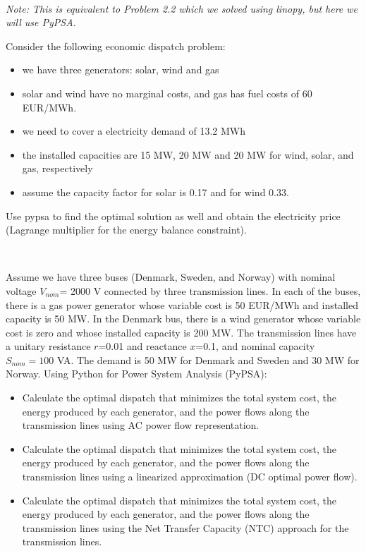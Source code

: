 \documentclass[10pt]{article}
\newenvironment{problem}[2][Problem]{\begin{trivlist}
\item[\hskip \labelsep {\bfseries #1}\hskip \labelsep {\bfseries #2.}]}{\end{trivlist}}
\begin{document}
\

\begin{problem}{5.3}

\textit{Note: This is equivalent to Problem 2.2 which we solved using linopy, but here we will use PyPSA.}

Consider the following economic dispatch problem:

\begin{itemize}
\item[-] we have three generators: solar, wind and gas

\item[-] solar and wind have no marginal costs, and gas has fuel costs of 60 EUR/MWh.

\item[-] we need to cover a electricity demand of 13.2 MWh

\item[-] the installed capacities are 15 MW, 20 MW and 20 MW for wind, solar, and gas, respectively

\item[-] assume the capacity factor for solar is 0.17 and for wind 0.33.
\end{itemize}

Use pypsa to find the optimal solution as well and obtain the electricity price (Lagrange multiplier for the energy balance constraint).
\end{problem}

\

\begin{problem}{5.4}
Assume we have three buses (Denmark, Sweden, and Norway) with nominal voltage $V_{nom}$= 2000 V connected by three transmission lines. In each of the buses, there is a gas power generator whose variable cost is 50 EUR/MWh and installed capacity is 50 MW. In the Denmark bus, there is a wind generator whose variable cost is zero and whose installed capacity is 200 MW. The transmission lines have a unitary resistance $r$=0.01 and reactance $x$=0.1, and nominal capacity $S_{nom}=100$ VA. The demand is 50 MW for Denmark and Sweden and 30 MW for Norway. Using Python for Power System Analysis (PyPSA):

\begin{itemize}
\item[a)] Calculate the optimal dispatch that minimizes the total system cost, the energy produced by each generator, and the power flows along the transmission lines using AC power flow representation.

\item[b)] Calculate the optimal dispatch that minimizes the total system cost,  the energy produced by each generator, and the power flows along the transmission lines using a linearized approximation (DC optimal power flow).

\item[c)] Calculate the optimal dispatch that minimizes the total system cost,  the energy produced by each generator, and the power flows along the transmission lines using the Net Transfer Capacity (NTC) approach for the transmission lines.
\end{itemize}

\end{problem}

\end{document}
